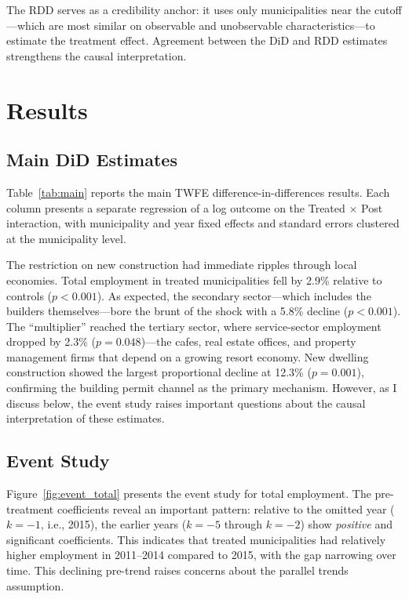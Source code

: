 \documentclass[12pt]{article}
\begin{document}
The RDD serves as a credibility anchor: it uses only municipalities near the cutoff---which are most similar on observable and unobservable characteristics---to estimate the treatment effect. Agreement between the DiD and RDD estimates strengthens the causal interpretation.

\section{Results}\label{sec:results}

\subsection{Main DiD Estimates}

Table~\ref{tab:main} reports the main TWFE difference-in-differences results. Each column presents a separate regression of a log outcome on the Treated $\times$ Post interaction, with municipality and year fixed effects and standard errors clustered at the municipality level.



The restriction on new construction had immediate ripples through local economies. Total employment in treated municipalities fell by 2.9\% relative to controls ($p < 0.001$). As expected, the secondary sector---which includes the builders themselves---bore the brunt of the shock with a 5.8\% decline ($p < 0.001$). The ``multiplier'' reached the tertiary sector, where service-sector employment dropped by 2.3\% ($p = 0.048$)---the cafes, real estate offices, and property management firms that depend on a growing resort economy. New dwelling construction showed the largest proportional decline at 12.3\% ($p = 0.001$), confirming the building permit channel as the primary mechanism. However, as I discuss below, the event study raises important questions about the causal interpretation of these estimates.

\subsection{Event Study}

Figure~\ref{fig:event_total} presents the event study for total employment. The pre-treatment coefficients reveal an important pattern: relative to the omitted year ($k = -1$, i.e., 2015), the earlier years ($k = -5$ through $k = -2$) show \textit{positive} and significant coefficients. This indicates that treated municipalities had relatively higher employment in 2011--2014 compared to 2015, with the gap narrowing over time. This declining pre-trend raises concerns about the parallel trends assumption.
\end{document}
